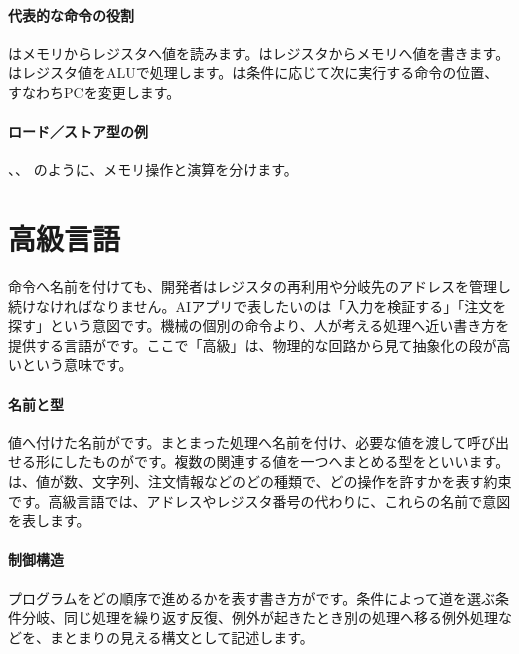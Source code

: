 \par
\endgroup
\medskip
\begingroup
\paragraph{代表的な命令の役割}
        はメモリからレジスタへ値を読みます。はレジスタからメモリへ値を書きます。
        はレジスタ値をALUで処理します。は条件に応じて次に実行する命令の位置、すなわちPCを変更します。

\paragraph{ロード／ストア型の例}
        、、 のように、メモリ操作と演算を分けます。

\par
\endgroup
\par
\endgroup


\section{高級言語}
\label{sec:02-language-03}

命令へ名前を付けても、開発者はレジスタの再利用や分岐先のアドレスを管理し続けなければなりません。AIアプリで表したいのは「入力を検証する」「注文を探す」という意図です。機械の個別の命令より、人が考える処理へ近い書き方を提供する言語がです。ここで「高級」は、物理的な回路から見て抽象化の段が高いという意味です。

\begingroup
\begingroup
\paragraph{名前と型}
        値へ付けた名前がです。まとまった処理へ名前を付け、必要な値を渡して呼び出せる形にしたものがです。複数の関連する値を一つへまとめる型をといいます。は、値が数、文字列、注文情報などのどの種類で、どの操作を許すかを表す約束です。高級言語では、アドレスやレジスタ番号の代わりに、これらの名前で意図を表します。

\par
\endgroup
\medskip
\begingroup
\paragraph{制御構造}
        プログラムをどの順序で進めるかを表す書き方がです。条件によって道を選ぶ条件分岐、同じ処理を繰り返す反復、例外が起きたとき別の処理へ移る例外処理などを、まとまりの見える構文として記述します。

